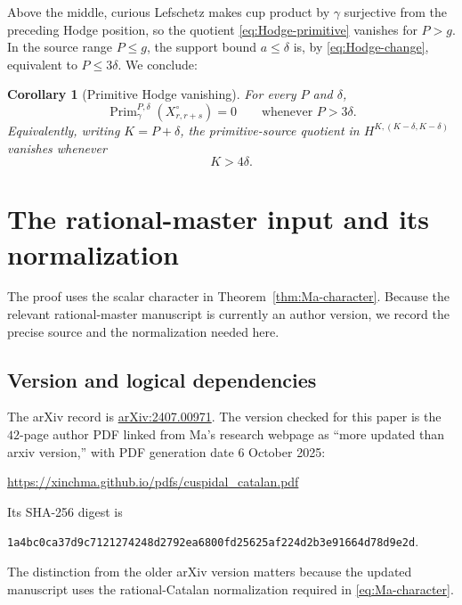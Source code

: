 \documentclass[11pt]{article}
\newtheorem{corollary}[theorem]{Corollary}
\newcommand{\Prim}{\operatorname{Prim}}
\begin{document}
Above the middle, curious Lefschetz makes cup product by $\gamma$
surjective from the preceding Hodge position, so the quotient
\eqref{eq:Hodge-primitive} vanishes for $P>g$.  In the source range
$P\leq g$, the support bound $a\leq\delta$ is, by
\eqref{eq:Hodge-change}, equivalent to $P\leq3\delta$.  We conclude:

\begin{corollary}[Primitive Hodge vanishing]\label{cor:Hodge-vanishing}
For every $P$ and $\delta$,
\begin{equation}\label{eq:Hodge-vanishing}
 \Prim_\gamma^{P,\delta}(X_{r,r+s}^{\circ})=0
 \qquad\text{whenever }P>3\delta.
\end{equation}
Equivalently, writing $K=P+\delta$, the primitive-source quotient in
$H^{K,(K-\delta,K-\delta)}$ vanishes whenever
\begin{equation}\label{eq:Hodge-vanishing-K}
 K>4\delta.
\end{equation}
\end{corollary}

\appendix

\section{The rational-master input and its normalization}
\label{app:Ma}

The proof uses the scalar character in
Theorem~\ref{thm:Ma-character}.  Because the relevant rational-master
manuscript is currently an author version, we record the precise
source and the normalization needed here.

\subsection{Version and logical dependencies}

The arXiv record is \href{https://arxiv.org/abs/2407.00971}{arXiv:2407.00971}.
The version checked for this paper is the $42$-page author PDF linked
from Ma's research webpage as ``more updated than arxiv version,''
with PDF generation date 6 October 2025:
\begin{center}
\url{https://xinchma.github.io/pdfs/cuspidal_catalan.pdf}
\end{center}
Its SHA-256 digest is
\begin{center}
\texttt{1a4bc0ca37d9c7121274248d2792ea6800fd25625af224d2b3e91664d78d9e2d}.
\end{center}
The distinction from the older arXiv version matters because the
updated manuscript uses the rational-Catalan normalization required in
\eqref{eq:Ma-character}.
\end{document}
